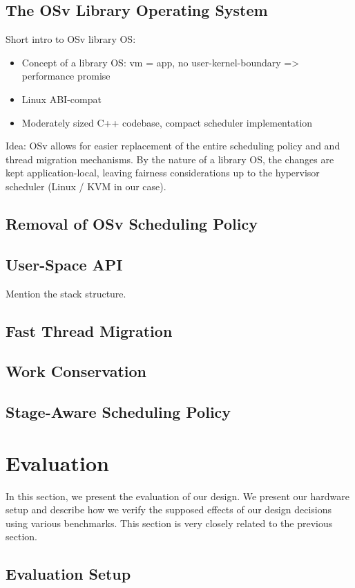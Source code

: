 \documentclass[12pt,a4paper]{article}
\begin{document}
\subsection{The OSv Library Operating System}\label{sec:di:osv}
Short intro to OSv library OS:
\begin{itemize}
    \item Concept of a library OS: vm = app, no user-kernel-boundary => performance promise
    \item Linux ABI-compat
    \item Moderately sized C++ codebase, compact scheduler implementation
\end{itemize}
Idea: OSv allows for easier replacement of the entire scheduling policy and and thread migration mechanisms.
By the nature of a library OS, the changes are kept application-local, leaving fairness considerations up to the hypervisor scheduler (Linux / KVM in our case).

\subsection{Removal of OSv Scheduling Policy}\label{sec:di:rmsched}
\subsection{User-Space API}\label{sec:di:api}
Mention the stack structure.
\subsection{Fast Thread Migration}\label{sec:di:mig}
\subsection{Work Conservation}\label{sec:di:workcons}
\subsection{Stage-Aware Scheduling Policy}\label{sec:di:pol}

\clearpage
\section{Evaluation}
In this section, we present the evaluation of our design.
We present our hardware setup and describe how we verify the supposed effects of our design decisions using various benchmarks.
This section is very closely related to the previous section.
\subsection{Evaluation Setup}
\end{document}
